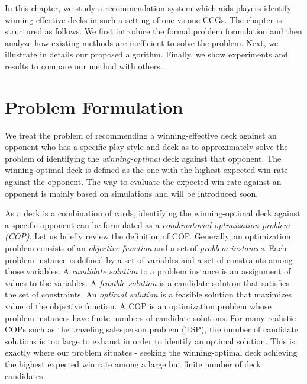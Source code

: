 In this chapter, we study a recommendation system which aids players identify winning-effective decks in such a setting of one-vs-one CCGs. The chapter is structured as follows. We first introduce the formal problem formulation and then analyze how existing methods are inefficient to solve the problem. Next, we illustrate in details our proposed algorithm. Finally, we show experiments and results to compare our method with others.

 
 \section{Problem Formulation}\label{sec:qdeckrec_probform}
We treat the problem of recommending a winning-effective deck against an opponent who has a specific play style and deck as to approximately solve the problem of identifying the \textit{winning-optimal} deck against that opponent. The winning-optimal deck is defined as the one with the highest expected win rate against the opponent. The way to evaluate the expected win rate against an opponent is mainly based on simulations and will be introduced soon.

As a deck is a combination of cards, identifying the winning-optimal deck against a specific opponent can be formulated as a \textit{combinatorial optimization problem (COP)}. Let us briefly review the definition of COP. Generally, an optimization problem consists of an \textit{objective function} and a set of \textit{problem instances}. Each problem instance is defined by a set of variables and a set of constraints among those variables. A \textit{candidate solution} to a problem instance is an assignment of values to the variables. A \textit{feasible solution} is a candidate solution that satisfies the set of constraints. An \textit{optimal solution} is a feasible solution that maximizes value of the objective function. A COP is an optimization problem whose problem instances have finite numbers of candidate solutions. For many realistic COPs such as the traveling salesperson problem (TSP), the number of candidate solutions is too large to exhaust in order to identify an optimal solution. This is exactly where our problem situates - seeking the winning-optimal deck achieving the highest expected win rate among a large but finite number of deck candidates.


